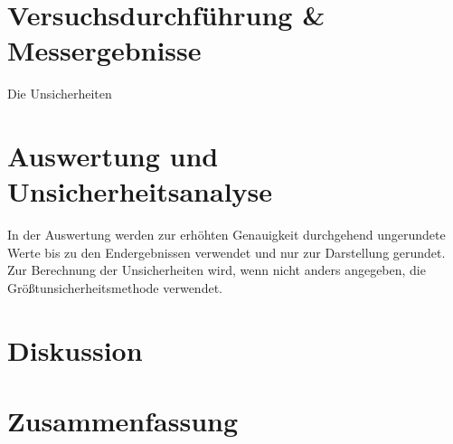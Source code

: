 \documentclass[12pt,a4paper,twoside]{article}
\begin{document}
\section{Versuchsdurchführung \& Messergebnisse} %

Die Unsicherheiten



\section{Auswertung und Unsicherheitsanalyse} %

In der Auswertung werden zur erhöhten Genauigkeit durchgehend ungerundete Werte bis zu den Endergebnissen verwendet und nur zur Darstellung gerundet. \\
Zur Berechnung der Unsicherheiten wird, wenn nicht anders angegeben, die Größtunsicherheitsmethode verwendet.


\section{Diskussion} %


\section{Zusammenfassung} %


\printbibliography[heading=bibintoc]
\end{document}
